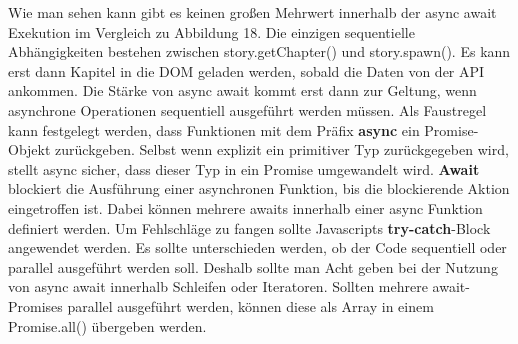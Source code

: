 \noindent
Wie man sehen kann gibt es keinen großen Mehrwert innerhalb der async await Exekution im Vergleich zu Abbildung 18. Die einzigen sequentielle Abhängigkeiten bestehen zwischen story.getChapter() und story.spawn(). Es kann erst dann Kapitel in die DOM geladen werden, sobald die Daten von der API ankommen. Die Stärke von async await kommt erst dann zur Geltung, wenn asynchrone Operationen sequentiell ausgeführt werden müssen. Als Faustregel kann festgelegt werden, dass Funktionen mit dem Präfix \textbf{async} ein Promise-Objekt zurückgeben. Selbst wenn explizit ein primitiver Typ zurückgegeben wird, stellt async sicher, dass dieser Typ in ein Promise umgewandelt wird. \textbf{Await} blockiert die Ausführung einer asynchronen Funktion, bis die blockierende Aktion eingetroffen ist. Dabei können mehrere awaits innerhalb einer async Funktion definiert werden. Um Fehlschläge zu fangen sollte Javascripts \textbf{try-catch}-Block angewendet werden. Es sollte unterschieden werden, ob der Code sequentiell oder parallel ausgeführt werden soll. Deshalb sollte man Acht geben bei der Nutzung von async await innerhalb Schleifen oder Iteratoren. Sollten mehrere await-Promises parallel ausgeführt werden, können diese als Array in einem Promise.all() übergeben werden.


